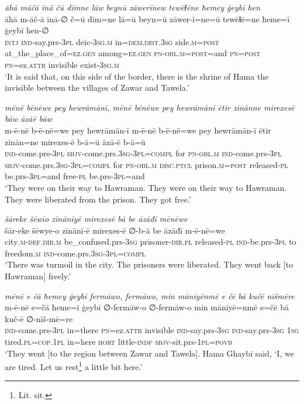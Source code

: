 \ea \label{BP.178}
\textit{āhā māčā īnā čū dīmne lāw beynū zāwerīnew tewēɫēne ħemey ġeybī hen} \\ 
\gll āhā m-āč-ā īnā-∅ č=ū dīm=ne lā=ū beyn=ū zāwer-ī=ne=ū tewēɫē=ne ħeme=ī ġeybī hen-∅ \\ 
 \textsc{intj} \textsc{ind-}say.prs\textsc{-3pl} deic\textsc{-3sg}\textsc{.m} in=\textsc{dem.dist}\textsc{.3sg} side\textsc{.m}\textsc{=\textsc{post}} at\_the\_place\_of\textsc{=ez.gen} among\textsc{=ez.gen} \textsc{pn}\textsc{-obl}\textsc{.m}\textsc{=\textsc{post}}=and \textsc{pn}\textsc{=\textsc{post}} \textsc{pn}=ez.\textsc{attr} invisible exist\textsc{-3sg}\textsc{.m} \\ 
\glt `It is said that, on this side of the border, there is the shrine of Hama the invisible between the villages of Zawar and Tawela.'
\z 
 
\ea \label{BP.179}
\textit{mēnē bēnēwe pey hewrāmānī, mēnē bēnēwe pey hewrāmānī ētir zīnānne mirexesē bāw āzāē bāw} \\ 
\gll m-ē-nē b-ē-nē=we pey hewrāmān-ī m-ē-nē b-ē-nē=we pey hewrāmān-ī ētir zīnān=ne mirexes-ē b-ā=ū āzā-ē b-ā=ū \\ 
 \textsc{ind-}come.prs\textsc{-3pl} \textsc{sbjv-}come.prs\textsc{.3sg}\textsc{-3pl}\textsc{=compl} for \textsc{pn}\textsc{-obl}\textsc{.m} \textsc{ind-}come.prs\textsc{-3pl} \textsc{sbjv-}come.prs\textsc{.3sg}\textsc{-3pl}\textsc{=compl} for \textsc{pn}\textsc{-obl}\textsc{.m} \textsc{disc.ptcl} prison\textsc{.m}\textsc{=\textsc{post}} released\textsc{\textsc{-pl}} be.prs\textsc{-3pl}=and free\textsc{\textsc{-pl}} be.prs\textsc{-3pl}=and \\ 
\glt `They were on their way to Hawraman. They were on their way to Hawraman. They were liberated from the prison. They got free.'
\z 
 
\ea \label{BP.180}
\textit{šāreke šēwīo zīnānīyē mirexesē bā be āzāđī mēnēwe} \\ 
\gll šār-eke šēwye-o zīnānī-ē mirexes-ē ∅-b-ā be āzāđī m-ē-nē=we \\ 
 city\textsc{.m}\textsc{-def}\textsc{.dir}\textsc{.m} be\_confused.prs\textsc{-3sg} prisoner\textsc{-dir}\textsc{.pl} released\textsc{\textsc{-pl}} \textsc{ind-}be.prs\textsc{-3pl} to freedom\textsc{.m} \textsc{ind-}come.prs\textsc{.3sg}\textsc{-3pl}\textsc{=compl} \\ 
\glt `There was turmoil in the city. The prisoners were liberated. They went back [to Hawraman] freely.'
\z 
 
\ea \label{BP.181}
\textit{mēnē e čā ħemey ġeybī fermāwo, fermāwo, min mānīyēnmē e čē bā kučē nīšmēre} \\ 
\gll m-ē-nē e=čā ħeme=ī ġeybī ∅-fermāw-o ∅-fermāw-o min mānīyē=nmē e=čē bā kuč-ē ∅-nīš-mē=re \\ 
 \textsc{ind-}come.prs\textsc{-3pl} in=there \textsc{pn}=ez.\textsc{attr} invisible \textsc{ind-}say.prs\textsc{-3sg} \textsc{ind-}say.prs\textsc{-3sg} \textsc{1sg} tired\textsc{.pl}\textsc{=cop}\textsc{.\textsc{1pl}} in=here \textsc{hort} little\textsc{-indf} \textsc{sbjv-}sit.prs\textsc{-\textsc{1pl}}\textsc{=\textsc{povb}} \\ 
\glt `They went [to the region between Zawar and Tawela]. Hama Ghaybi said, ‘I, we are tired. Let us rest\footnote{Lit. sit.} a little bit here.'
\z 
 
